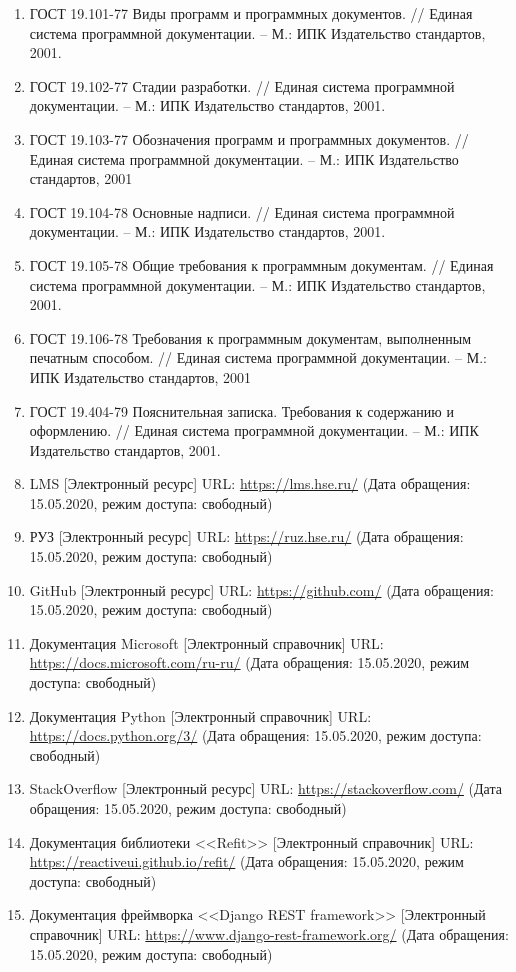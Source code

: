 \documentclass{../includes/TechDoc}
\begin{document}
    \begin{enumerate}
        \item ГОСТ 19.101-77 Виды программ и программных документов. // Единая система программной документации. – М.: ИПК Издательство стандартов, 2001.
        \item ГОСТ 19.102-77 Стадии разработки. // Единая система программной документации. – М.: ИПК Издательство стандартов, 2001.
        \item ГОСТ 19.103-77 Обозначения программ и программных документов. // Единая система программной документации. – М.: ИПК Издательство стандартов, 2001
        \item ГОСТ 19.104-78 Основные надписи. // Единая система программной документации. – М.: ИПК Издательство стандартов, 2001.
        \item ГОСТ 19.105-78 Общие требования к программным документам. // Единая система программной документации. – М.: ИПК Издательство стандартов, 2001.
        \item ГОСТ 19.106-78 Требования к программным документам, выполненным печатным способом. // Единая система программной документации. – М.: ИПК Издательство стандартов, 2001
        \item ГОСТ 19.404-79 Пояснительная записка. Требования к содержанию и оформлению. // Единая система программной документации. – М.: ИПК Издательство стандартов, 2001.
        \item LMS [Электронный ресурс] URL: \url{https://lms.hse.ru/} (Дата обращения: 15.05.2020, режим доступа: свободный)
        \item РУЗ [Электронный ресурс] URL: \url{https://ruz.hse.ru/} (Дата обращения: 15.05.2020, режим доступа: свободный)
        \item GitHub [Электронный ресурс] URL: \url{https://github.com/} (Дата обращения: 15.05.2020, режим доступа: свободный)
        \item Документация Microsoft [Электронный справочник] URL: \url{https://docs.microsoft.com/ru-ru/} (Дата обращения: 15.05.2020, режим доступа: свободный)
        \item Документация Python [Электронный справочник] URL: \url{https://docs.python.org/3/} (Дата обращения: 15.05.2020, режим доступа: свободный)
        \item StackOverflow [Электронный ресурс] URL: \url{https://stackoverflow.com/} (Дата обращения: 15.05.2020, режим доступа: свободный)
        \item Документация библиотеки <<Refit>> [Электронный справочник] URL: \url{https://reactiveui.github.io/refit/} (Дата обращения: 15.05.2020, режим доступа: свободный)
        \item Документация фреймворка <<Django REST framework>> [Электронный справочник] URL: \url{https://www.django-rest-framework.org/} (Дата обращения: 15.05.2020, режим доступа: свободный)
    \end{enumerate}
\end{document}
